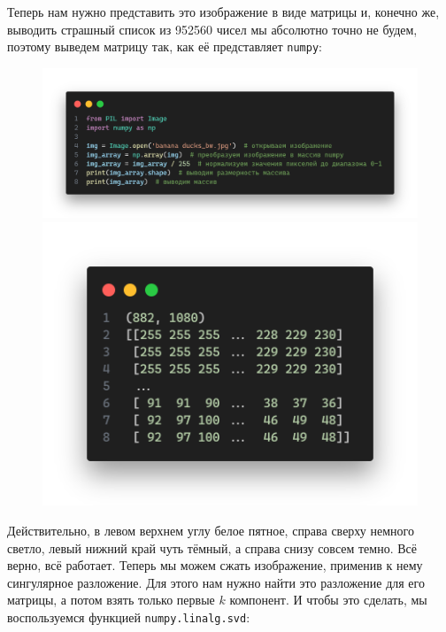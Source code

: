 \documentclass[a3paper,14pt]{extarticle}
\begin{document}
\pagebreak \noindent Теперь нам нужно представить это изображение в виде матрицы и, конечно же, выводить страшный список из 952560 чисел мы абсолютно точно не будем, поэтому выведем матрицу так, как её представляет \texttt{numpy}:
\begin{figure}[H]
    \begin{minipage}{0.63\textwidth}
        \centering\includegraphics[width=\textwidth]{code2.png}
    \end{minipage}\hfill
    \begin{minipage}{0.33\textwidth}
        \centering\includegraphics[width=\textwidth]{output1.png}
    \end{minipage}
\end{figure} \noindent
Действительно, в левом верхнем углу белое пятное, справа сверху немного светло, левый нижний край чуть тёмный, а справа снизу совсем темно. Всё верно, всё работает. Теперь мы можем сжать изображение, применив к нему сингулярное разложение. Для этого нам нужно найти это разложение для его матрицы, а потом взять только первые $k$ компонент. И чтобы это сделать, мы воспользуемся функцией \texttt{numpy.linalg.svd}:
\end{document}
